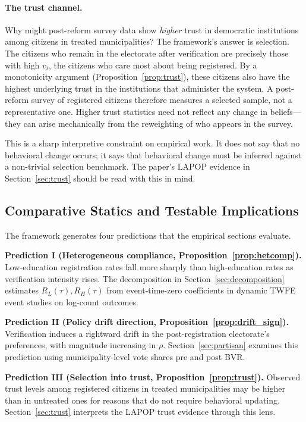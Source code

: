 \paragraph{The trust channel.} Why might post-reform survey data show \emph{higher} trust in democratic institutions among citizens in treated municipalities? The framework's answer is selection. The citizens who remain in the electorate after verification are precisely those with high $v_i$, the citizens who care most about being registered. By a monotonicity argument (Proposition~\ref{prop:trust}), these citizens also have the highest underlying trust in the institutions that administer the system. A post-reform survey of registered citizens therefore measures a selected sample, not a representative one. Higher trust statistics need not reflect any change in beliefs---they can arise mechanically from the reweighting of who appears in the survey.

This is a sharp interpretive constraint on empirical work. It does not say that no behavioral change occurs; it says that behavioral change must be inferred against a non-trivial selection benchmark. The paper's LAPOP evidence in Section~\ref{sec:trust} should be read with this in mind.

\subsection{Comparative Statics and Testable Implications}
\label{ssec:testable}

The framework generates four predictions that the empirical sections evaluate.

\textbf{Prediction I (Heterogeneous compliance, Proposition~\ref{prop:hetcomp}).} Low-education registration rates fall more sharply than high-education rates as verification intensity rises. The decomposition in Section~\ref{sec:decomposition} estimates $R_L(\tau), R_H(\tau)$ from event-time-zero coefficients in dynamic TWFE event studies on log-count outcomes.

\textbf{Prediction II (Policy drift direction, Proposition~\ref{prop:drift_sign}).} Verification induces a rightward drift in the post-registration electorate's preferences, with magnitude increasing in $\rho$. Section~\ref{sec:partisan} examines this prediction using municipality-level vote shares pre and post BVR.

\textbf{Prediction III (Selection into trust, Proposition~\ref{prop:trust}).} Observed trust levels among registered citizens in treated municipalities may be higher than in untreated ones for reasons that do not require behavioral updating. Section~\ref{sec:trust} interprets the LAPOP trust evidence through this lens.

